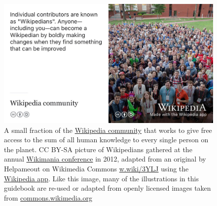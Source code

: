 \documentclass[
]{book}
\begin{document}
\begin{figure}

{\centering \includegraphics[width=0.99\linewidth]{images/wikipedians} 

}

\caption{A small fraction of the \href{https://en.wikipedia.org/wiki/Wikipedia_community}{Wikipedia community} that works to give free access to the sum of all human knowledge to every single person on the planet. CC BY-SA picture of Wikipedians gathered at the annual \href{https://en.wikipedia.org/wiki/Wikimania}{Wikimania conference} in 2012, adapted from an original by Helpameout on Wikimedia Commons \href{https://w.wiki/3YLJ}{w.wiki/3YLJ} using the \href{https://apps.apple.com/us/app/wikipedia/id324715238}{Wikipedia app}. Like this image, many of the illustrations in this guidebook are re-used or adapted from openly licensed images taken from \href{https://commons.wikimedia.org/}{commons.wikimedia.org}}\label{fig:wikipedians-fig}
\end{figure}
\end{document}
